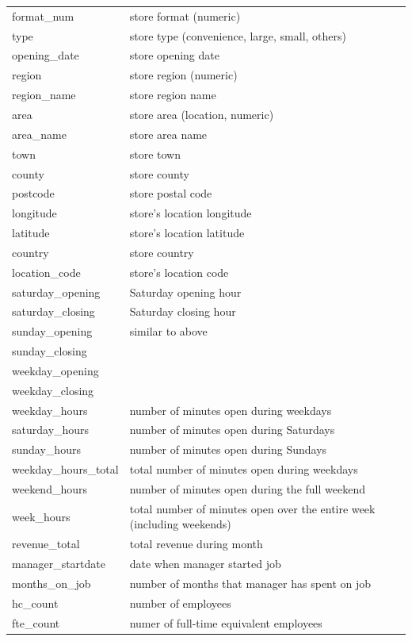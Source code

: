 \documentclass[
]{article}
\begin{document}
\begin{longtable}{ll}
format\_num & store format (numeric) \\
type & store type (convenience, large, small, others) \\
opening\_date & store opening date \\
region & store region (numeric) \\
region\_name & store region name\\
area & store area (location, numeric) \\
area\_name & store area name \\
town & store town \\
county & store county \\
postcode & store postal code \\
longitude & store's location longitude \\
latitude & store's location latitude \\
country & store country \\
location\_code & store's location code \\
saturday\_opening & Saturday opening hour \\
saturday\_closing & Saturday closing hour \\
sunday\_opening & similar to above \\
sunday\_closing &  \\
weekday\_opening &  \\
weekday\_closing &  \\
weekday\_hours & number of minutes open during weekdays \\
saturday\_hours & number of minutes open during Saturdays \\
sunday\_hours & number of minutes open during Sundays \\
weekday\_hours\_total & total number of minutes open during weekdays \\
weekend\_hours & number of minutes open during the full weekend \\
week\_hours & total number of minutes open over the entire week (including weekends) \\
revenue\_total & total revenue during month \\
manager\_startdate & date when manager started job \\
months\_on\_job & number of months that manager has spent on job \\
hc\_count & number of employees \\
fte\_count & numer of full-time equivalent employees \\

\end{longtable}
\end{document}
